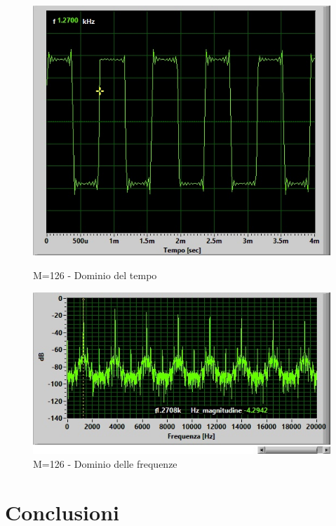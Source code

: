 \documentclass[a4paper]{article}
\begin{document}
\begin{figure}[H]
   \begin{minipage}{0.48\textwidth}
     \centering
     \includegraphics[width=1\linewidth]{m126}
     \caption{M=126 - Dominio del tempo}\label{Fig:Data1}
   \end{minipage}\hfill
   \begin{minipage}{0.48\textwidth}
     \centering
     \includegraphics[width=1\linewidth]{m126f}
     \caption{M=126 - Dominio delle frequenze}\label{Fig:Data2}
   \end{minipage}
\end{figure}



\section{Conclusioni}
\end{document}
